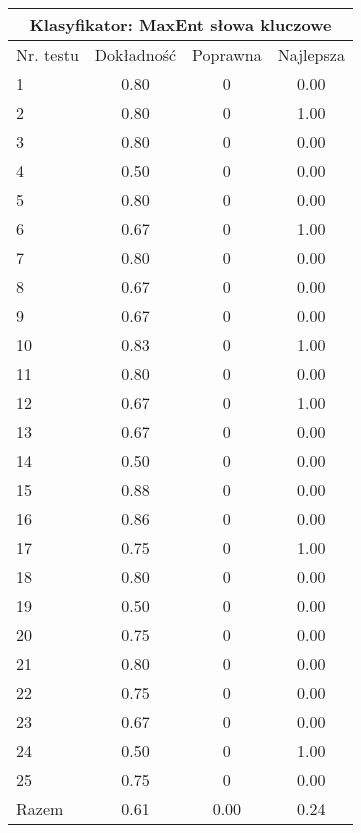 \documentclass[notitlepage,leqno,fleqn,a4paper]{article}
\begin{document}
\begin{tabular}{|l|c|c|c|}
\hline
\multicolumn{4}{|c|}{Klasyfikator: MaxEnt słowa kluczowe}\\
\hline
Nr. testu & Dokładność & Poprawna & Najlepsza\\
\hline
1 & 0.80 & 0 & 0.00 \\
2 & 0.80 & 0 & 1.00 \\
3 & 0.80 & 0 & 0.00 \\
4 & 0.50 & 0 & 0.00 \\
5 & 0.80 & 0 & 0.00 \\
6 & 0.67 & 0 & 1.00 \\
7 & 0.80 & 0 & 0.00 \\
8 & 0.67 & 0 & 0.00 \\
9 & 0.67 & 0 & 0.00 \\
10 & 0.83 & 0 & 1.00 \\
11 & 0.80 & 0 & 0.00 \\
12 & 0.67 & 0 & 1.00 \\
13 & 0.67 & 0 & 0.00 \\
14 & 0.50 & 0 & 0.00 \\
15 & 0.88 & 0 & 0.00 \\
16 & 0.86 & 0 & 0.00 \\
17 & 0.75 & 0 & 1.00 \\
18 & 0.80 & 0 & 0.00 \\
19 & 0.50 & 0 & 0.00 \\
20 & 0.75 & 0 & 0.00 \\
21 & 0.80 & 0 & 0.00 \\
22 & 0.75 & 0 & 0.00 \\
23 & 0.67 & 0 & 0.00 \\
24 & 0.50 & 0 & 1.00 \\
25 & 0.75 & 0 & 0.00 \\
\hline
Razem & 0.61 & 0.00 & 0.24 \\
\hline
\end{tabular}
\end{document}
